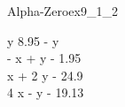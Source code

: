 
\begin{bilevelmodel}{Alpha-Zero}{ex9_1_2}
    \begin{upperlevel}{0}{
        
    }
    \end{upperlevel}
    \begin{lowerlevel}{y}{
         8.95 - y  \\ 
 - x + y - 1.95  \\ 
 x + 2 y - 24.9  \\ 
 4 x - y - 19.13 
    }
    \end{lowerlevel}
\end{bilevelmodel}
    
        